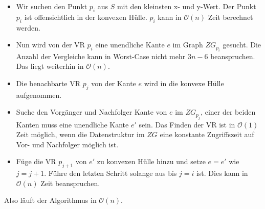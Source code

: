 \documentclass[a4paper]{article}
\begin{document}
\begin{itemize}

\item Wir suchen den Punkt $p_i$ aus $S$ mit den kleinsten x- und y-Wert. Der Punkt $p_i$ ist offensichtlich in der konvexen Hülle. $p_i$ kann in $\mathcal{O}(n)$ Zeit berechnet werden.

\item Nun wird von der VR $p_i$ eine unendliche Kante $e$ im Graph $ZG_{p_i}$ gesucht. Die Anzahl der Vergleiche kann in Worst-Case nicht mehr $3 n-6$ beanspruchen. Das liegt weiterhin in $\mathcal{O}(n)$.

\item Die benachbarte VR $p_j$ von der Kante $e$ wird in die konvexe Hülle aufgenommen.

\item Suche den Vorgänger und Nachfolger Kante von $e$ im $ZG_{p_j}$, einer der beiden Kanten muss eine unendliche Kante $e'$ sein. Das Finden der VR ist in $\mathcal{O}(1)$ Zeit möglich, wenn die Datenstruktur im $ZG$ eine konstante Zugriffszeit auf Vor- und Nachfolger möglich ist. 

\item Füge die VR $p_{j+1}$ von $e'$ zu konvexen Hülle hinzu und setze $e = e'$ wie $j=j+1$. Führe den letzten Schritt solange aus bis $j=i$ ist. Dies kann in $\mathcal{O}(n)$ Zeit beanspruchen.

\end{itemize}

Also läuft der Algorithmus in $\mathcal{O}(n)$.
\end{document}
